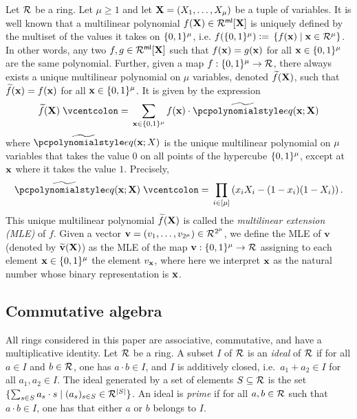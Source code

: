 \documentclass[11pt,letterpaper,usenames,dvipsnames]{article}
\newcommand{\alberturgent}[1]{\textcolor{red}{Albert: {#1}}}
\begin{document}
Let $\mathcal{R}$ be a ring. Let $\mu\geq 1$ and let $\mathbf{X}=(X_1,\ldots, X_\mu)$ be a tuple of variables. It is well known \cite{thaler_book} that a multilinear polynomial $f(\mathbf{X})\in \mathcal{R}^{\mathsf{ml}}[\mathbf{X}]$ is uniquely defined by the multiset of the values it takes on $\{0,1\}^\mu$, i.e. $f(\{0,1\}^\mu){\;\vcentcolon=\;} \left\{ f(\mathbf{x})\mid \mathbf{x}\in \mathcal{R}^\mu\right\}$. In other words, any two $f,g\in \mathcal{R}^{\mathsf{ml}}[\mathbf{X}]$ such that $f(\mathbf{x})=g(\mathbf{x})$ for all $\mathbf{x}\in \{0,1\}^\mu$ are the same polynomial. Further, given a map $f: \{0,1\}^\mu \to \mathcal{R}$, there always exists a unique multilinear polynomial on $\mu$ variables, denoted $\widetilde{f}(\mathbf{X})$, such that $\widetilde{f}(\mathbf{x})= f(\mathbf{x})$ for all $\mathbf{x}\in \{0,1\}^\mu$. It is given by the expression
%
\begin{equation}\label{e: MLE}
    \multilinmle{f}(\XX)\defeq \sum_{\xx\in \BB^\mu} f(\xx)\cdot \meq(\xx; \XX) 
\end{equation}
%
where $\meq(\xx; X)$ is the unique multilinear polynomial on $\mu$ variables that takes the value $0$ on all points of the hypercube $\{0,1\}^\mu$, except at $\mathbf{x}$ where it takes the value $1$. Precisely,
%
$$
\meq(\xx; \XX) \defeq \prod_{i\in [\mu]} \left(x_i X_i - (1-x_i)(1-X_i)\right).
$$
This unique multilinear polynomial $\widetilde{f}(\mathbf{X})$ is called the \emph{multilinear extension (MLE)} of $f$. Given a vector $\mathbf{v}=(v_1,\ldots, v_{2^\mu}) \in \mathcal{R}^{2^\mu}$, we define the MLE of $\mathbf{v}$ (denoted by $\widetilde{\mathbf{v}}(\mathbf{X})$) as the MLE of the map $\mathbf{v}:\{0,1\}^{\mu}\to \mathcal{R}$ assigning to each element $\mathbf{x}\in \{0,1\}^{\mu}$ the element $v_{\mathbf{x}}$, where here we interpret $\mathbf{x}$ as the natural number whose binary representation is $\mathbf{x}$. 



\subsection{Commutative algebra}
\label{sec:commutative-algebra}

All rings considered in this paper are associative, commutative, and have a multiplicative identity. Let $\mathcal{R}$ be a ring. A subset $I$ of $\mathcal{R}$ is an \emph{ideal} of $\mathcal{R}$ if for all $a\in I$ and $b\in \mathcal{R}$, one has $a\cdot b \in I$, and $I$ is additively closed, i.e.\ $a_1 + a_2 \in I$ for all $a_1, a_2\in I$. The ideal generated by a set of elements $S\subseteq \mathcal{R}$ is the set $\{\sum_{s\in S} a_s \cdot s \mid (a_s)_{s\in S}\in \mathcal{R}^{|S|}\}$. An ideal is \emph{prime} if for all $a,b\in \mathcal{R}$ such that $a\cdot b \in I$, one has that either $a$ or $b$ belongs to $I$. 
\end{document}
